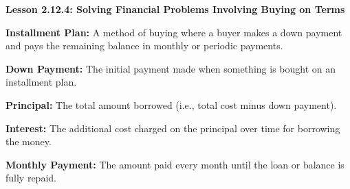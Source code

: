 \begin{center}
\textbf{Lesson 2.12.4: Solving Financial Problems Involving Buying on Terms}
\end{center}


    \noindent \textbf{Installment Plan:} A method of buying where a buyer makes a down payment and pays the remaining balance in monthly or periodic payments.

    \noindent \textbf{Down Payment:} The initial payment made when something is bought on an installment plan.

    \noindent \textbf{Principal:} The total amount borrowed (i.e., total cost minus down payment).

    \noindent \textbf{Interest:} The additional cost charged on the principal over time for borrowing the money.

    \noindent \textbf{Monthly Payment:} The amount paid every month until the loan or balance is fully repaid.




